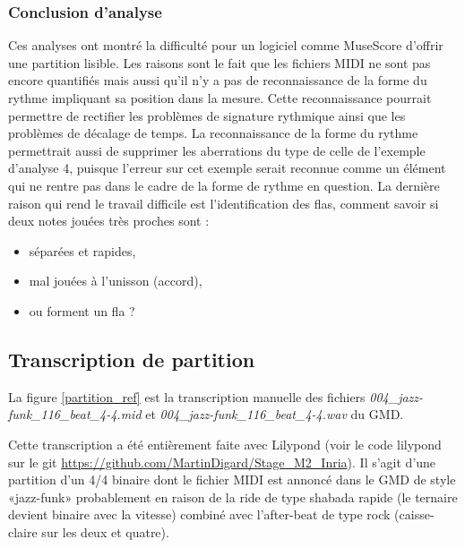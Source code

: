 \subsubsection{Conclusion d’analyse}
Ces analyses ont montré la difficulté pour un logiciel comme MuseScore d’offrir
une partition lisible. Les raisons sont le fait que les fichiers MIDI ne sont
pas encore quantifiés mais aussi qu’il n’y a pas de reconnaissance de la forme 
du rythme impliquant sa position dans la mesure. Cette reconnaissance pourrait
permettre de rectifier les problèmes de signature rythmique ainsi que les
problèmes de décalage de temps. La reconnaissance de la forme du rythme
permettrait aussi de supprimer les aberrations du type de celle de l’exemple
d’analyse 4, puisque l’erreur sur cet exemple serait reconnue comme un élément
qui ne rentre pas dans le cadre de la forme de rythme en question. La dernière
raison qui rend le travail difficile est l’identification des flas, comment
savoir si deux notes jouées très proches sont :
\begin{itemize}
    \item séparées et rapides,
    \item mal jouées à l’unisson (accord),
    \item ou forment un fla ?
\end{itemize}


\subsection*{Transcription de partition}
\label{partition_entiere}
La figure \ref{partition_ref} est la transcription manuelle des fichiers
\textit{004\_jazz-funk\_116\_beat\_4-4.mid} et
\textit{004\_jazz-funk\_116\_beat\_4-4.wav} du GMD.

Cette transcription a été entièrement faite avec Lilypond (voir le code
lilypond sur le git \url{https://github.com/MartinDigard/Stage_M2_Inria}). Il
s’agit d’une partition d’un 4/4 binaire dont le fichier MIDI est annoncé dans
le GMD de style «jazz-funk» probablement en raison de la ride de type shabada
rapide (le ternaire devient binaire avec la vitesse) combiné avec l’after-beat
de type rock (caisse-claire sur les deux et quatre).

